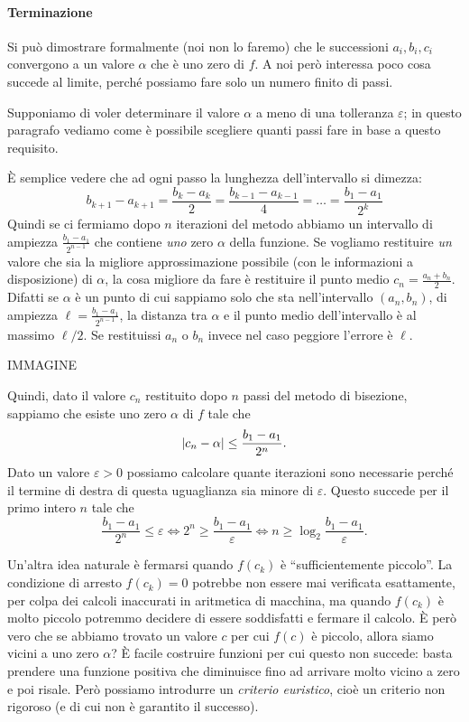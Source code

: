 \documentclass[a4paper]{report}
\DeclarePairedDelimiter{\abs}{\lvert}{\rvert}
\theoremstyle{definiton}
\theoremstyle{remark}
\begin{document}
\paragraph{Terminazione}

Si può dimostrare formalmente (noi non lo faremo) che le successioni $a_i,b_i,c_i$ convergono a un valore $\alpha$ che è uno zero di $f$. A noi però interessa poco cosa succede al limite, perché possiamo fare solo un numero finito di passi.


Supponiamo di voler determinare il valore $\alpha$ a meno di una tolleranza $\varepsilon$; in questo paragrafo vediamo come è possibile scegliere quanti passi fare in base a questo requisito.

È semplice vedere che ad ogni passo la lunghezza dell'intervallo si dimezza:
\[
b_{k+1} - a_{k+1} = \frac{b_{k} - a_{k}}{2} = \frac{b_{k-1} - a_{k-1}}{4} = \dots = \frac{b_{1} - a_{1}}{2^k}
\]
Quindi se ci fermiamo dopo $n$ iterazioni del metodo abbiamo un intervallo di ampiezza $\frac{b_1-a_1}{2^{n-1}}$ che contiene \emph{uno} zero $\alpha$ della funzione. Se vogliamo restituire \emph{un} valore che sia la migliore approssimazione possibile (con le informazioni a disposizione) di $\alpha$, la cosa migliore da fare è restituire il punto medio $c_n = \frac{a_n + b_n}{2}$. Difatti se $\alpha$ è un punto di cui sappiamo solo che sta nell'intervallo $(a_n,b_n)$, di ampiezza $\ell = \frac{b_1-a_1}{2^{n-1}}$, la distanza tra $\alpha$ e il punto medio dell'intervallo è al massimo $\ell/2$. Se restituissi $a_n$ o $b_n$ invece nel caso peggiore l'errore è $\ell$.

IMMAGINE

Quindi, dato il valore $c_n$ restituito dopo $n$ passi del metodo di bisezione, sappiamo che esiste uno zero $\alpha$ di $f$ tale che 
\[
\abs{c_n - \alpha} \leq \frac{b_1-a_1}{2^{n}}.
\]
Dato un valore $\varepsilon > 0$ possiamo calcolare quante iterazioni sono necessarie perché il termine di destra di questa uguaglianza sia minore di $\varepsilon$. Questo succede per il primo intero $n$ tale che
\[
\frac{b_1 - a_1}{2^n} \leq \varepsilon \iff 2^n \geq \frac{b_1 - a_1}{\varepsilon} \iff n \geq \log_2 \frac{b_1 - a_1}{\varepsilon}.
\]

Un'altra idea naturale è fermarsi quando $f(c_k)$ è ``sufficientemente piccolo''. La condizione di arresto $f(c_k) = 0$ potrebbe non essere mai verificata esattamente, per colpa dei calcoli inaccurati in aritmetica di macchina, ma quando $f(c_k)$ è molto piccolo potremmo decidere di essere soddisfatti e fermare il calcolo. È però vero che se abbiamo trovato un valore $c$ per cui $f(c)$ è piccolo, allora siamo vicini a uno zero $\alpha$? È facile costruire funzioni per cui questo non succede: basta prendere una funzione positiva che diminuisce fino ad arrivare molto vicino a zero e poi risale. Però possiamo introdurre un \emph{criterio euristico}, cioè un criterio non rigoroso (e di cui non è garantito il successo). 
\end{document}
